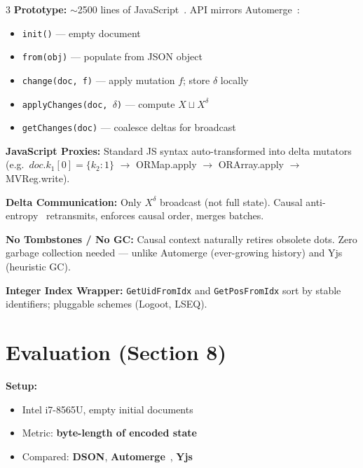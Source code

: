 \documentclass[a0,portrait]{a0poster}
\begin{document}
\begin{multicols}{3}
\textbf{Prototype:} $\sim$2500 lines of JavaScript~\cite{rinberg2021dson}. API mirrors Automerge~\cite{automerge}:
\begin{itemize}
  \item \texttt{init()} --- empty document
  \item \texttt{from(obj)} --- populate from JSON object
  \item \texttt{change(doc,\,f)} --- apply mutation $f$; store $\delta$ locally
  \item \texttt{applyChanges(doc,\,$\delta$)} --- compute $X \sqcup X^\delta$
  \item \texttt{getChanges(doc)} --- coalesce deltas for broadcast
\end{itemize}

\textbf{JavaScript Proxies:} Standard JS syntax auto-transformed into delta mutators (e.g.\ $doc.k_1[0]=\{k_2:1\}$ $\rightarrow$ ORMap.apply $\rightarrow$ ORArray.apply $\rightarrow$ MVReg.write).

\textbf{Delta Communication:} Only $X^\delta$ broadcast (not full state). Causal anti-entropy~\cite{almeida2018delta} retransmits, enforces causal order, merges batches.

\textbf{No Tombstones / No GC:} Causal context naturally retires obsolete dots. Zero garbage collection needed --- unlike Automerge (ever-growing history) and Yjs (heuristic GC).

\textbf{Integer Index Wrapper:} \texttt{GetUidFromIdx} and \texttt{GetPosFromIdx} sort by stable identifiers; pluggable schemes (Logoot, LSEQ).


\section*{Evaluation (Section 8)}
\small

\textbf{Setup:}
\begin{itemize}
\item Intel i7-8565U, empty initial documents
\item Metric: \textbf{byte-length of encoded state}
\item Compared: \textbf{DSON}, \textbf{Automerge}~\cite{automerge}, \textbf{Yjs}~\cite{yjs}
\end{itemize}

\vspace{0.3cm}



\end{multicols}
\end{document}

